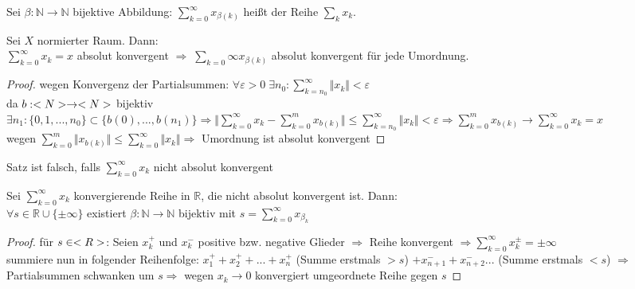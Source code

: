 \begin{*definition}[Umordnung]
	Sei $\beta:\mathbb{N}\rightarrow\mathbb{N}$ bijektive Abbildung: $\sum_{k=0}^\infty x_{\beta(k)}$ heißt  der Reihe $\sum_k x_k$.
\end{*definition}
\begin{proposition}
	Sei $X$ normierter Raum. Dann:\\
	$\sum_{k=0}^\infty x_k = x$ absolut konvergent $\Rightarrow\;\sum_{k=0}\infty x_{\beta(k)}$ absolut konvergent für jede Umordnung.
\end{proposition}
\begin{proof}
	wegen Konvergenz der Partialsummen: $\forall\varepsilon>0\;\exists n_0:\sum_{k=n_0}^{\infty} \Vert x_k\Vert<\varepsilon$ \\
	da $b:<N>\to<N>$ bijektiv $\exists n_1:\{0,1,...,n_0\}\subset \{b(0),...,b(n_1)\}\Rightarrow \Vert\sum_{k=0}^{\infty} x_k - \sum_{k=0}^m x_{b(k)}\Vert\le \sum_{k=n_0}^{\infty} \Vert x_k\Vert<\varepsilon\Rightarrow\sum_{k=0}^m x_{b(k)}\to \sum_{k=0}^{\infty} x_k=x$ \\
	wegen $\sum_{k=0}^m \Vert x_{b(k)}\Vert\le \sum_{k=0}^{\infty} \Vert x_k\Vert\Rightarrow$ Umordnung ist absolut konvergent
\end{proof}

\begin{underlinedenvironment}[Hinweis]
	Satz  ist falsch, falls $\sum_{k=0}^{\infty} x_k$ nicht absolut konvergent
\end{underlinedenvironment}

\begin{proposition}
	Sei $\sum_{k=0}^\infty x_k$ konvergierende Reihe in $\mathbb{R}$, die nicht absolut konvergent ist. Dann:\\
	$\forall s\in\mathbb{R}\cup \{\pm\infty\}$ existiert $\beta:\mathbb{N}\rightarrow\mathbb{N}$ bijektiv mit $s=\sum_{k=0}^\infty x_{\beta_k}$
\end{proposition}
\begin{proof}
	für $s\in<R>$: Seien $x^+_k$ und $x^-_k$ positive bzw. negative Glieder $\Rightarrow$ Reihe konvergent $\Rightarrow\sum_{k=0}^{\infty} x^{\pm}_k=\pm\infty$ \\
	summiere nun in folgender Reihenfolge: $x^+_1+x^+_2+...+x^+_n$ (Summe erstmals $>s$) $+x^-_{n+1}+x^-_{n+2}...$ (Summe erstmals $<s$) $\Rightarrow$ Partialsummen schwanken um $s\Rightarrow$ wegen $x_k\to 0$ konvergiert umgeordnete Reihe gegen $s$
\end{proof}

